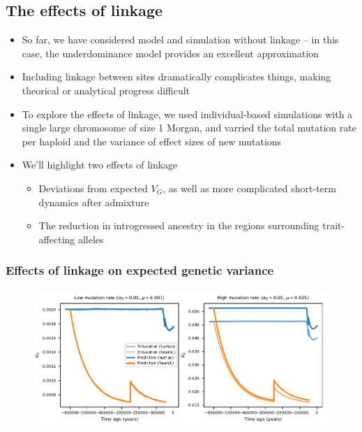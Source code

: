 \documentclass{article}
\begin{document}
\subsection*{The effects of linkage}

\begin{itemize}
    \item So far, we have considered model and simulation without linkage -- in this
        case, the underdominance model provides an excellent approximation
    \item Including linkage between sites dramatically complicates things, making
        theorical or analytical progress difficult
    \item To explore the effects of linkage, we used individual-based simulations
        with a single large chromosome of size 1 Morgan, and varried the total
        mutation rate per haploid and the variance of effect sizes of new mutations
    \item We'll highlight two effects of linkage
        \begin{itemize}
            \item Deviations from expected $V_G$, as well as more complicated
                short-term dynamics after admixture
            \item The reduction in introgressed ancestry in the regions surrounding
                trait-affecting alleles
        \end{itemize}
\end{itemize}

\subsubsection*{Effects of linkage on expected genetic variance}

\begin{figure}[t!]
    \centering
    \includegraphics{../figures/model_comparison.SD_0.01.mu_0.001_0.025}
    \caption{}
    \label{fig:linkage-deviations}
\end{figure}
\end{document}
